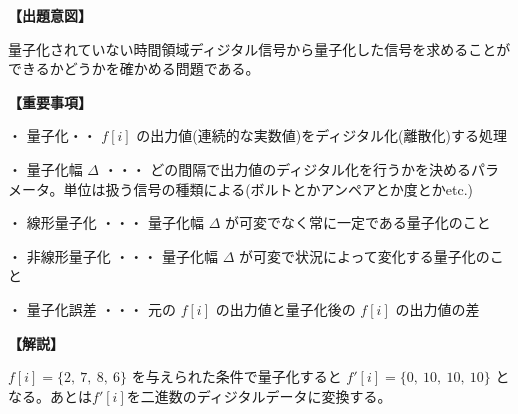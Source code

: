 \noindent \textbf{【出題意図】}

\noindent 量子化されていない時間領域ディジタル信号から量子化した信号を求めることができるかどうかを確かめる問題である。

\vspace{1em}
\noindent \textbf{【重要事項】}

\medskip
\noindent ・ 量子化・・ $f[i]$ の出力値(連続的な実数値)をディジタル化(離散化)する処理

\medskip
\noindent ・ 量子化幅 $\Delta$ ・・・ どの間隔で出力値のディジタル化を行うかを決めるパラメータ。単位は扱う信号の種類による(ボルトとかアンペアとか度とかetc.)

\medskip
\noindent ・ 線形量子化 ・・・ 量子化幅  $\Delta$ が可変でなく常に一定である量子化のこと

\medskip
\noindent ・ 非線形量子化 ・・・ 量子化幅  $\Delta$ が可変で状況によって変化する量子化のこと

\medskip
\noindent ・ 量子化誤差 ・・・ 元の $f[i]$ の出力値と量子化後の $f[i]$ の出力値の差

\vspace{1em}
\noindent \textbf{【解説】}

\noindent $f[i] = \{2,\ 7,\ 8,\ 6 \}$ を与えられた条件で量子化すると $f'[i] = \{0,\ 10,\ 10,\ 10 \}$ となる。あとは$f'[i]$を二進数のディジタルデータに変換する。
